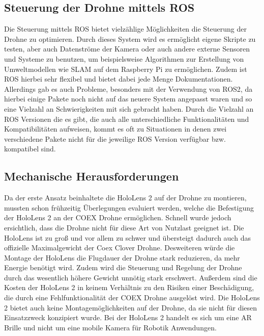 \subsection{Steuerung der Drohne mittels ROS}\label{steuerung_drohne_ros:subsection}
Die Steuerung mittels \ac{ROS} bietet vielzählige Möglichkeiten die Steuerung der Drohne zu optimieren. Durch dieses System wird es ermöglicht eigene Skripte zu testen, aber auch Datenströme der Kamera oder auch andere externe Sensoren und Systeme zu benutzen, um beispielsweise Algorithmen zur Erstellung von Umweltmodellen wie \ac{SLAM} auf dem Raspberry Pi zu ermöglichen. Zudem ist \ac{ROS} hierbei sehr flexibel und bietet dabei jede Menge Dokumentationen.
Allerdings gab es auch Probleme, besonders mit der Verwendung von ROS2, da hierbei einige Pakete noch nicht auf das neuere System angepasst waren und so eine Vielzahl an Schwierigkeiten mit sich gebracht haben. Durch die Vielzahl an \ac{ROS} Versionen die es gibt, die auch alle unterschiedliche Funktionalitäten und Kompatibilitäten aufweisen, kommt es oft zu Situationen in denen zwei verschiedene Pakete nicht für die jeweilige \ac{ROS} Version verfügbar bzw. kompatibel sind.


\subsection{Mechanische Herausforderungen}\label{mechanische-herausforderungen:section}

Da der erste Ansatz beinhaltete die HoloLens 2 auf der Drohne zu montieren, mussten schon frühzeitig Überlegungen evaluiert werden, welche die Befestigung der HoloLens 2 an der COEX Drohne ermöglichen. Schnell wurde jedoch ersichtlich, dass die Drohne nicht für diese Art von Nutzlast geeignet ist. Die HoloLens ist zu groß und vor allem zu schwer und übersteigt dadurch auch das offizielle Maximalgewicht der Coex Clover Drohne. Desweiteren würde die Montage der HoloLens die Flugdauer der Drohne stark reduzieren, da mehr Energie benötigt wird. Zudem wird die Steuerung und Regelung der Drohne durch das wesentlich höhere Gewicht unnötig stark erschwert. Außerdem sind die Kosten der HoloLens 2 in keinem Verhältnis zu den Risiken einer Beschädigung, die durch eine Fehlfunktionalität der COEX Drohne ausgelöst wird. Die HoloLens 2 bietet auch keine Montagemöglichkeiten auf der Drohne, da sie nicht für diesen Einsatzzweck konzipiert wurde. Bei der HoloLens 2 handelt es sich um eine \ac{AR} Brille und nicht um eine mobile Kamera für Robotik Anwendungen.

